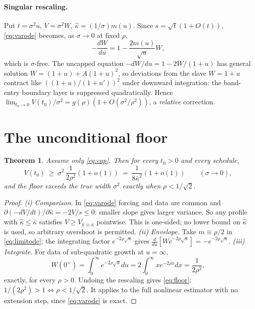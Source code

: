 \documentclass[10pt]{article}
\newcommand{\kb}{\bar\kappa}
\newcommand{\sigsq}{\sigma^2}
\newtheorem{theorem}{Theorem}
\begin{document}
\paragraph{Singular rescaling.} Put $t=\sigsq u$, $V=\sigsq W$, $\hat\kappa=(1/\sigma)m(u)$.
Since $s=\sqrt t(1+O(t))$, \eqref{eq:varode} becomes, as $\sigma\to0$ at fixed $\rho$,
\begin{equation}
-\frac{dW}{du}=1-\frac{2m(u)}{\sqrt u}W,
\label{eq:limitode}
\end{equation}
which is $\sigma$-free. The uncapped equation $-dW/du=1-2W/(1+u)$ has general solution
$W=(1+u)+A(1+u)^2$, so deviations from the slave $W=1+u$ contract like
$((1+u)/(1+u'))^2$ under downward integration: the band-entry boundary layer is suppressed
quadratically. Hence $\lim_{t_0\to0}V(t_0)/\sigsq=g(\rho)(1+O(\sigsq/\rho^2))$, a
\emph{relative} correction.

\section{The unconditional floor}\label{sec:U}
\begin{theorem}\label{thm:U}
Assume only \eqref{eq:cap}. Then for every $t_0>0$ and every schedule,
\begin{equation}
V(t_0)\ \ge\ \sigsq\,\frac{1}{2\rho^2}(1+o(1))\ =\ \frac{1}{8\kb^2}(1+o(1))\qquad(\sigma\to0),
\label{eq:floor}
\end{equation}
and the floor exceeds the true width $\sigsq$ exactly when $\rho<1/\sqrt2$.
\end{theorem}
\begin{proof}
\emph{(i) Comparison.} In \eqref{eq:varode} forcing and data are common and
$\partial(-dV/dt)/\partial\hat\kappa=-2V/s\le0$: smaller slope gives larger variance. So any
profile with $\hat\kappa\le\kb$ satisfies $V\ge V_{\hat\kappa\equiv\kb}$ pointwise. This is
one-sided; no lower bound on $\hat\kappa$ is used, so arbitrary overshoot is permitted.
\emph{(ii) Envelope.} Take $m\equiv\rho/2$ in \eqref{eq:limitode}; the integrating factor
$e^{-2\rho\sqrt u}$ gives $\frac{d}{du}[We^{-2\rho\sqrt u}]=-e^{-2\rho\sqrt u}$.
\emph{(iii) Integrate.} For data of sub-quadratic growth at $u=\infty$,
\[
W(0^+)=\int_0^\infty\! e^{-2\rho\sqrt u}du=2\!\int_0^\infty\! xe^{-2\rho x}dx=\frac{1}{2\rho^2},
\]
exactly, for every $\rho>0$. Undoing the rescaling gives \eqref{eq:floor};
$1/(2\rho^2)>1\iff\rho<1/\sqrt2$. It applies to the full nonlinear estimator with no
extension step, since \eqref{eq:varode} is exact.
\end{proof}
\end{document}
